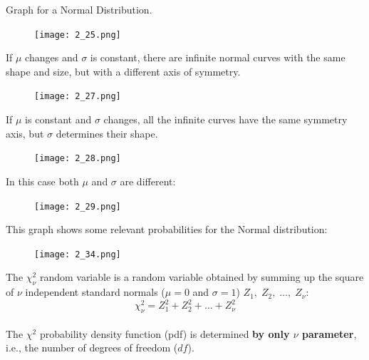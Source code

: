 \begin{frame} 
  \vspace*{.25cm}
  Graph for  a Normal Distribution.\\
  \vspace*{.25cm}
  \begin{figure}
    \texttt{[image: 2\_25.png]}
  \end{figure}
\end{frame}

\begin{frame} 
  \vspace*{.25cm}
  If {\boldmath$\mu $} changes and {\boldmath$\sigma$} is constant, there are infinite normal curves with the same  shape and size, but with a different axis of symmetry.
  \begin{figure}
    \texttt{[image: 2\_27.png]}
  \end{figure}
\end{frame}

\begin{frame} 
  \vspace*{.25cm}
  If {\boldmath$\mu $} is constant and  {\boldmath$\sigma$} changes, all the infinite curves have the same symmetry axis, but {\boldmath$\sigma$} determines their shape.
  \begin{figure}
    \texttt{[image: 2\_28.png]}
  \end{figure}
\end{frame}

\begin{frame} 
  \vspace*{.25cm}
  In this case both {\boldmath$\mu $} and {\boldmath$\sigma$} are different:\\
  \begin{figure}
    \texttt{[image: 2\_29.png]}
  \end{figure}
\end{frame}

\begin{frame} 
  \vspace*{.25cm}
  This graph shows some relevant probabilities for the Normal distribution:\\
  \begin{figure}
    \texttt{[image: 2\_34.png]}
  \end{figure}
\end{frame}


\begin{frame}
  \vspace*{1cm}
  The {\boldmath $ \chi_\nu^2 $} random variable is a random variable obtained by summing up the square of $ \nu $ independent standard normals ($ \mu = 0 $ and $ \sigma = 1 $) $ Z_1,\;  Z_2,\;  \dots,\; Z_\nu $:\\
  $$\chi^2_\nu=Z_1^2 + Z_2^2 + \dots + Z_\nu^2$$\\
  \vspace*{.75cm}
  The $ \chi^2 $ probability density function (pdf) is determined \textbf{by only {\boldmath $ \nu $} parameter}, i.e., the number of degrees of freedom ($df$).\\
\end{frame}

